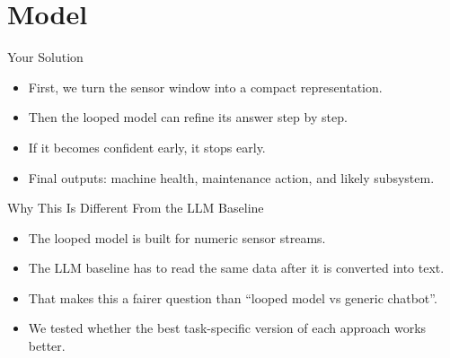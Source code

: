 \section{Model}

\begin{frame}{Your Solution}
  \begin{center}
  \end{center}
  \vspace{0.3cm}
  \begin{itemize}
    \item First, we turn the sensor window into a compact representation.
    \item Then the looped model can refine its answer step by step.
    \item If it becomes confident early, it stops early.
    \item Final outputs: machine health, maintenance action, and likely subsystem.
  \end{itemize}
\end{frame}

\begin{frame}{Why This Is Different From the LLM Baseline}
  \begin{itemize}
    \item The looped model is built for numeric sensor streams.
    \item The LLM baseline has to read the same data after it is converted into text.
    \item That makes this a fairer question than ``looped model vs generic chatbot''.
    \item We tested whether the best task-specific version of each approach works better.
  \end{itemize}
\end{frame}
